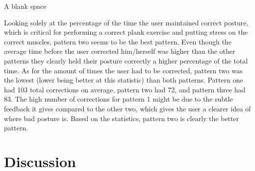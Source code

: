 \documentclass[sigconf]{acmart}
\begin{document}
{\color{white} A blank space } \linebreak

Looking solely at the percentage of the time the user maintained correct posture, which is critical for performing a correct plank exercise and putting stress on the correct muscles, pattern two seems to be the best pattern. Even though the average time before the user corrected him/herself was higher than the other patterns they clearly held their posture correctly a higher percentage of the total time. As for the amount of times the user had to be corrected, pattern two was the lowest (lower being better at this statistic) than both patterns. Pattern one had 103 total corrections on average, pattern two had 72, and pattern three had 83. The high number of corrections for pattern 1 might be due to the subtle feedback it gives compared to the other two, which gives the user a clearer idea of where bad posture is.
Based on the statistics, pattern two is clearly the better pattern.






\section{Discussion}
\end{document}
